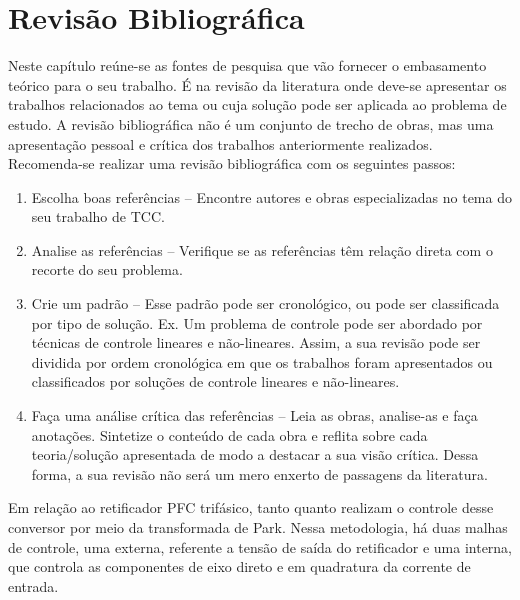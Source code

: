 \chapter{Revisão Bibliográfica}
Neste capítulo reúne-se as fontes de pesquisa que vão fornecer o embasamento teórico para o seu 
trabalho. É na revisão da literatura onde deve-se apresentar os trabalhos relacionados ao tema 
ou cuja solução pode ser aplicada ao problema de estudo. A revisão bibliográfica não é um 
conjunto de trecho de obras, mas uma apresentação pessoal e crítica dos trabalhos anteriormente 
realizados. Recomenda-se realizar uma revisão bibliográfica com os seguintes passos:
\begin{enumerate}
	\item Escolha boas referências – Encontre autores e obras especializadas no tema do seu trabalho de TCC.
	\item Analise as referências – Verifique se as referências têm relação direta com o recorte do seu problema.
	\item Crie um padrão – Esse padrão pode ser cronológico, ou pode ser classificada por tipo de solução. Ex. Um problema de controle pode ser abordado por técnicas de controle lineares e não-lineares. Assim, a sua revisão pode ser dividida por ordem cronológica em que os trabalhos foram apresentados ou classificados por soluções de controle lineares e não-lineares. 
	\item Faça uma análise crítica das referências – Leia as obras, analise-as e faça anotações. Sintetize o conteúdo de cada obra e reflita sobre cada teoria/solução apresentada de modo a destacar a sua visão crítica. Dessa forma, a sua revisão não será um mero enxerto de passagens da literatura.
\end{enumerate}

Em relação ao retificador PFC trifásico, tanto \cite{3phPlecs} quanto \cite{WANG2013/03} 
realizam o controle desse conversor por meio da transformada de Park.  Nessa metodologia, há 
duas malhas de controle, uma externa, referente a tensão de saída do retificador e uma interna,
 que controla as componentes de eixo direto e em quadratura da corrente de entrada.
